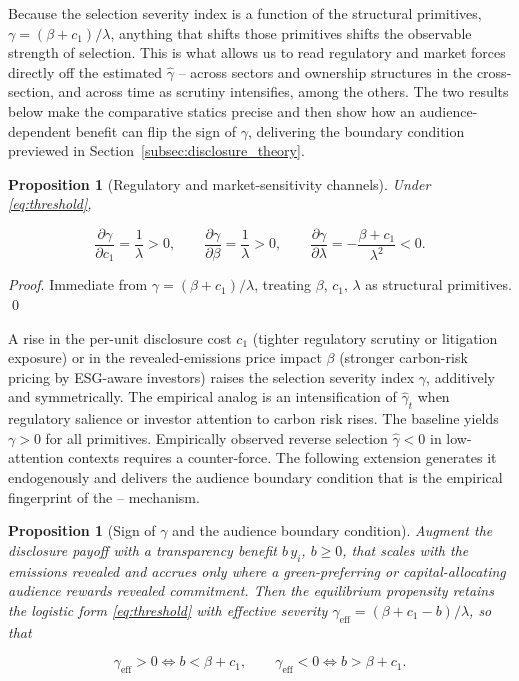 \documentclass[a4paper,12pt]{article}
\newcommand{\citet}[1]{\textcite{#1}}
\newtheorem{proposition}[theorem]{Proposition}
\begin{document}
Because the selection severity index is a function of the structural primitives, $\gamma = (\beta + c_1)/\lambda$, anything that shifts those primitives shifts the observable strength of selection. This is what allows us to read regulatory and market forces directly off the estimated $\hat\gamma$ -- across sectors and ownership structures in the cross-section, and across time as scrutiny intensifies, among the others. The two results below make the comparative statics precise and then show how an audience-dependent benefit can flip the sign of $\gamma$, delivering the boundary condition previewed in Section~\ref{subsec:disclosure_theory}.

\begin{proposition}[Regulatory and market-sensitivity channels] \label{prop:regulatory_channel}
Under \eqref{eq:threshold},

\begin{equation}
    \frac{\partial \gamma}{\partial c_1} = \frac{1}{\lambda} >0, \qquad  \frac{\partial \gamma}{\partial \beta} = \frac{1}{\lambda} >0, \qquad  \frac{\partial \gamma}{\partial \lambda} = - \frac{\beta + c_1}{\lambda^2} <0.
\end{equation}
\end{proposition}

\textit{Proof}. Immediate from $\gamma = (\beta + c_1)/\lambda$, treating $\beta, \, c_1, \, \lambda$ as structural primitives. \hfill \qed

A rise in the per-unit disclosure cost $c_1$ (tighter regulatory scrutiny or litigation exposure) or in the revealed-emissions price impact $\beta$ (stronger carbon-risk pricing by ESG-aware investors) raises the selection severity index $\gamma$, additively and symmetrically. The empirical analog is an intensification of $\hat{\gamma}_t$ when regulatory salience or investor attention to carbon risk rises. The baseline yields $\gamma >0$ for all primitives. Empirically observed reverse selection $\hat{\gamma}<0$ in low-attention contexts requires a counter-force. The following extension generates it endogenously and delivers the audience boundary condition that is the empirical fingerprint of the \citet{milgrom1981good}-- \citet{verrecchia1983discretionary} mechanism.

\begin{proposition}[Sign of $\gamma$ and the audience boundary condition] \label{prop:gamma}
Augment the disclosure payoff with a transparency benefit $b\, y_i$, $b \geq 0$, that scales with the emissions revealed and accrues only where a green-preferring or capital-allocating audience rewards revealed commitment. Then the equilibrium propensity retains the logistic form \eqref{eq:threshold} with effective severity $\gamma_{\textrm{eff}} = (\beta + c_1 -b)/\lambda$, so that

\begin{equation}
    \gamma_{\textrm{eff}} > 0 \iff b < \beta + c_1, \qquad \gamma_{\textrm{eff}} < 0 \iff b > \beta + c_1.
\end{equation}
\end{proposition}
\end{document}
